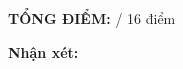 \documentclass[12pt,a4paper]{article}
\begin{document}
\vspace{0.5cm}
\noindent\textbf{TỔNG ĐIỂM:} \underline{\hspace{2cm}} / 16 điểm

\vspace{0.5cm}
\noindent\textbf{Nhận xét:}

\underline{\hspace{\textwidth}}

\underline{\hspace{\textwidth}}
\end{document}
